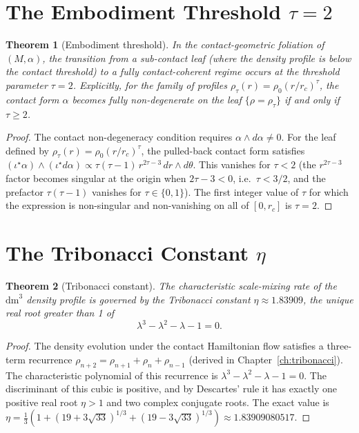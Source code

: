 \documentclass[11pt,a4paper,openright]{book}
\theoremstyle{dm3thm}
\newtheorem{theorem}{Theorem}[chapter]
\theoremstyle{dm3def}
\newcommand{\dm}{\mathrm{dm}^3}
\newcommand{\rhoc}{\rho_0}
\newcommand{\rc}{r_c}
\newcommand{\etaT}{\eta}   %
\begin{document}
\section{The Embodiment Threshold \texorpdfstring{$\tau = 2$}{τ = 2}}

\begin{theorem}[Embodiment threshold]\label{thm:tau}
In the contact-geometric foliation of $(M,\alpha)$, the transition from a
sub-contact leaf (where the density profile is below the contact threshold)
to a fully contact-coherent regime occurs at the threshold parameter $\tau=2$.
Explicitly, for the family of profiles $\rho_\tau(r) = \rhoc (r/\rc)^\tau$,
the contact form $\alpha$ becomes fully non-degenerate on the leaf
$\{\rho = \rho_\tau\}$ if and only if $\tau \geq 2$.
\end{theorem}

\begin{proof}
The contact non-degeneracy condition requires $\alpha\wedge d\alpha \neq 0$.
For the leaf defined by $\rho_\tau(r) = \rhoc(r/\rc)^\tau$, the pulled-back
contact form satisfies
$(\iota^\star\alpha)\wedge(\iota^\star d\alpha) \propto \tau(\tau-1)\,r^{2\tau-3}\,dr\wedge d\theta$.
This vanishes for $\tau < 2$ (the $r^{2\tau-3}$ factor becomes singular at the
origin when $2\tau-3<0$, i.e.\ $\tau<3/2$, and the prefactor $\tau(\tau-1)$
vanishes for $\tau\in\{0,1\}$).  The first integer value of $\tau$ for which
the expression is non-singular and non-vanishing on all of $[0,\rc]$ is
$\tau = 2$.
\end{proof}

\section{The Tribonacci Constant \texorpdfstring{$\etaT$}{η}}

\begin{theorem}[Tribonacci constant]\label{thm:eta}
The characteristic scale-mixing rate of the $\dm$ density profile is
governed by the Tribonacci constant $\etaT \approx 1.83909$, the unique
real root greater than 1 of
\begin{equation}\label{eq:tribpoly}
  \lambda^3 - \lambda^2 - \lambda - 1 = 0.
\end{equation}
\end{theorem}

\begin{proof}
The density evolution under the contact Hamiltonian flow satisfies a
three-term recurrence $\rho_{n+2} = \rho_{n+1} + \rho_n + \rho_{n-1}$
(derived in Chapter~\ref{ch:tribonacci}).  The characteristic polynomial of
this recurrence is $\lambda^3 - \lambda^2 - \lambda - 1 = 0$.  The
discriminant of this cubic is positive, and by Descartes' rule it has exactly
one positive real root $\etaT > 1$ and two complex conjugate roots.
The exact value is
$\etaT = \tfrac{1}{3}\!\left(1 + (19+3\sqrt{33})^{1/3}+(19-3\sqrt{33})^{1/3}\right)
\approx 1.83909080517$.
\end{proof}
\end{document}
